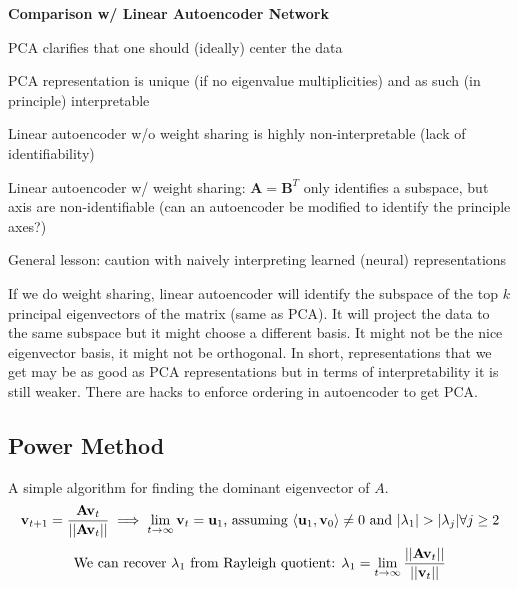 \documentclass[12pt]{article}
\begin{document}
\par \textbf{Comparison w/ Linear Autoencoder Network}
\ulb
\item PCA clarifies that one should (ideally) center the data
\item PCA representation is unique (if no eigenvalue multiplicities) and as such (in principle) interpretable
\item Linear autoencoder w/o weight sharing is highly non-interpretable (lack of identifiability)
\item Linear autoencoder w/ weight sharing: $\mathbf{A}=\mathbf{B}^T$ only identifies a subspace, but axis are non-identifiable (can an autoencoder be modified to identify the principle axes?)
\item General lesson: caution with naively interpreting learned (neural) representations
\ule
\par If we do weight sharing, linear autoencoder will identify the subspace of the top $k$ principal eigenvectors of the matrix (same as PCA). It will project the data to the same subspace but it might choose a different basis. It might not be the nice eigenvector basis, it might not be orthogonal. In short, representations that we get may be as good as PCA representations but in terms of interpretability it is still weaker. There are hacks to enforce ordering in autoencoder to get PCA.

\subsection{Power Method}
\par A simple algorithm for finding the dominant eigenvector of $A$.
\[ \mathbf{v}_{t+1} = \frac{\mathbf{Av}_t}{\snorm{\mathbf{Av}_t}} \implies \lim_{t\rightarrow \infty} \mathbf{v}_t = \mathbf{u}_1 \text{, assuming } \langle \mathbf{u}_1, \mathbf{v}_0 \rangle \neq 0 \text{ and } |\lambda_1|>|\lambda_j| \forall j\geq 2 \]
\[ \text{We can recover $\lambda_1$ from Rayleigh quotient: } \lambda_1 = \lim_{t\rightarrow\infty} \frac{||\mathbf{Av}_t||}{||\mathbf{v}_t||} \]
\end{document}
